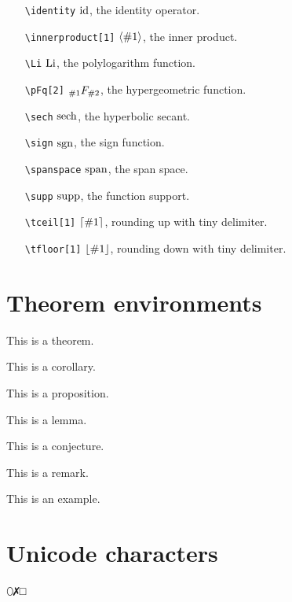 \documentclass{article}
\begin{document}
\begin{itemize}
    \item[\texttt{\textbackslash identity}] $\operatorname{id}$, the identity operator.
    \item[\texttt{\textbackslash innerproduct[1]}] $\left\langle{\#1}\right\rangle$, the inner product.
    \item[\texttt{\textbackslash Li}] $\operatorname{Li}$, the polylogarithm function.
    \item[\texttt{\textbackslash pFq[2]}] ${}_{\#1}F_{\#2}$, the hypergeometric function.
    \item[\texttt{\textbackslash sech}] $\operatorname{sech}$, the hyperbolic secant.
    \item[\texttt{\textbackslash sign}] $\operatorname{sgn}$, the sign function.
    \item[\texttt{\textbackslash spanspace}] $\operatorname{span}$, the span space.
    \item[\texttt{\textbackslash supp}] $\operatorname{supp}$, the function support.
    \item[\texttt{\textbackslash tceil[1]}] ${\lceil{\#1}\rceil}$, rounding up with tiny delimiter.
    \item[\texttt{\textbackslash tfloor[1]}] ${\lfloor{\#1}\rfloor}$, rounding down with tiny delimiter.
\end{itemize}

\section{Theorem environments}
\begin{theorem}
    This is a theorem.
\end{theorem}
\begin{corollary}
    This is a corollary.
\end{corollary}
\begin{proposition}
    This is a proposition.
\end{proposition}
\begin{lemma}
    This is a lemma.
\end{lemma}
\begin{conjecture}
    This is a conjecture.
\end{conjecture}

\begin{remark}
    This is a remark.
\end{remark}

\begin{example}
    This is an example.
\end{example}

\section{Unicode characters}
⬯✗□

\nocite{*}


\end{document}
